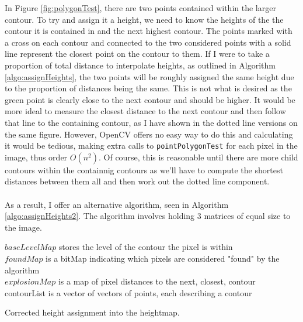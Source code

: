 \documentclass[11pt]{article}
\begin{document}
In Figure \ref{fig:polygonTest}, there are two points contained within
the larger contour. To try and assign it a height, we need to know the heights
of the the contour it is contained in and the next highest contour. 
The points marked with a cross on each contour and connected to the
two considered points with a solid line represent the closest
point on the contour to them. If I were to take a proportion of total
distance to interpolate heights, as outlined in Algorithm 
\ref{algo:assignHeights}, the two points will be roughly assigned the 
same height due to the proportion of distances being the same. This is
not what is desired as the green point is clearly close to the next contour 
and should be higher. It would be more ideal to measure the closest distance
to the next contour and then follow that line to the containing contour, as
I have shown in the dotted line versions on the same figure. However,
OpenCV offers no easy way to do this and calculating it would be tedious,
making extra calls to \texttt{pointPolygonTest} for each pixel in the 
image, thus order $O(n^2)$. Of course, this is reasonable until there
are more child contours within the containnig contours as we'll have to
compute the shortest distances between them all and then work out the 
dotted line component.\\
\\
As a result, I offer an alternative algorithm, seen in 
Algorithm \ref{algo:assignHeights2}. The algorithm involves holding 3
matrices of equal size to the image. 

\begin{algorithm}
\DontPrintSemicolon
$baseLevelMap$ stores the level of the contour the pixel is within\\
$foundMap$ is a bitMap indicating which pixels are considered "found" by the
			algorithm\\
$explosionMap$ is a map of pixel distances to the next, closest, contour\\
contourList is a vector of vectors of points, each describing a contour\\
\caption{Corrected height assignment into the heightmap.}
\label{algo:assignHeights2}
\end{algorithm}
\end{document}

